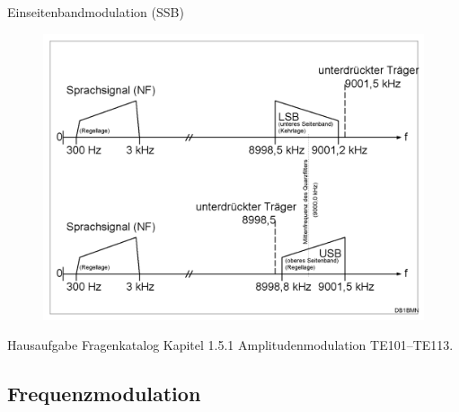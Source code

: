 \begin{frame}{Einseitenbandmodulation (SSB)}
  \begin{center}
    \begin{figure}
      \includegraphics[width=1\textwidth,height=.75\textheight,keepaspectratio]{e16/Ssb-de.png}
    \end{figure}
  \end{center}
\end{frame}

\begin{frame}
  \begin{exampleblock}{Hausaufgabe}
    Fragenkatalog Kapitel 1.5.1 Amplitudenmodulation TE101--TE113.
  \end{exampleblock}
\end{frame}



\subsection[FM]{Frequenzmodulation}

